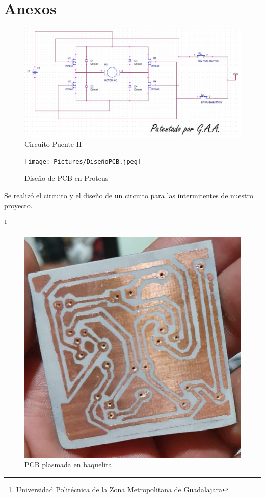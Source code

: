 \documentclass[11pt,a4paper]{article}
\begin{document}
\newpage
\section{Anexos} 
\begin{figure}[hbtp]
\centering
\includegraphics[scale=0.45]{Pictures/Puente_H.jpg}
\caption{Circuito Puente H}
\end{figure}

\begin{figure}[hbtp]
\centering
\texttt{[image: Pictures/DiseñoPCB.jpeg]}
\caption{Diseño de PCB en Proteus}
\end{figure}

Se realizó el circuito y el diseño de un circuito para las intermitentes de nuestro proyecto. 

\footnote{Universidad Politécnica de la Zona Metropolitana de Guadalajara}

\newpage
\begin{figure}[hbtp]
\centering
\includegraphics[scale=0.4]{Pictures/PCB.jpeg}
\caption{PCB plasmada en baquelita}
\end{figure}
\end{document}
